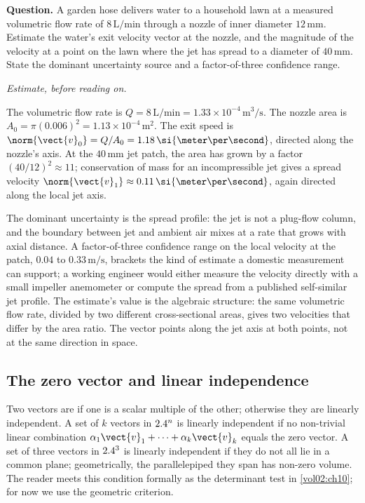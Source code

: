 \begin{estimation}
\textbf{Question.} A garden hose delivers water to a household lawn at
a measured volumetric flow rate of $8 \,\si{\liter\per\minute}$
through a nozzle of inner diameter $12 \,\si{\milli\meter}$. Estimate
the water's exit velocity vector at the nozzle, and the magnitude of
the velocity at a point on the lawn where the jet has spread to a
diameter of $40 \,\si{\milli\meter}$. State the dominant uncertainty
source and a factor-of-three confidence range.

\smallskip
\textit{Estimate, before reading on.}

\smallskip
The volumetric flow rate is $Q = 8 \,\si{\liter\per\minute} = 1.33
\times 10^{-4} \,\si{\meter\cubed\per\second}$. The nozzle area is
$A_{0} = \pi (0.006)^{2} = 1.13 \times 10^{-4} \,\si{\meter\squared}$.
The exit speed is $\norm{\vect{v}_{0}} = Q / A_{0} = 1.18 \,\si
{\meter\per\second}$, directed along the nozzle's axis. At the
$40 \,\si{\milli\meter}$ jet patch, the area has grown by a factor
$(40/12)^{2} \approx 11$; conservation of mass for an incompressible
jet gives a spread velocity $\norm{\vect{v}_{1}} \approx 0.11 \,\si
{\meter\per\second}$, again directed along the local jet axis.

The dominant uncertainty is the spread profile: the jet is not a
plug-flow column, and the boundary between jet and ambient air mixes
at a rate that grows with axial distance. A factor-of-three confidence
range on the local velocity at the patch, $0.04$ to $0.33 \,\si{\meter
\per\second}$, brackets the kind of estimate a domestic measurement
can support; a working engineer would either measure the velocity
directly with a small impeller anemometer or compute the spread from
a published self-similar jet profile. The estimate's value is the
algebraic structure: the same volumetric flow rate, divided by two
different cross-sectional areas, gives two velocities that differ by
the area ratio. The vector points along the jet axis at both points,
not at the same direction in space.
\end{estimation}

\subsection{The zero vector and linear independence}

Two vectors are  if one is a scalar
multiple of the other; otherwise they are linearly independent. A set
of $k$ vectors in $2.4^{n}$ is linearly independent if no non-trivial
linear combination $\alpha_{1}\vect{v}_{1} + \cdots + \alpha_{k}
\vect{v}_{k}$ equals the zero vector. A set of three vectors in
$2.4^{3}$ is linearly independent if they do not all lie in a common
plane; geometrically, the parallelepiped they span has non-zero
volume. The reader meets this condition formally as the determinant
test in \cref{vol02:ch10}; for now we use the geometric criterion.

